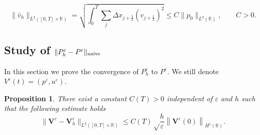 \documentclass[a4paper,french,english,10pt]{article}
\newcommand\eps{\varepsilon}
\newcommand\V{\mathbf{V}}
\newtheorem{proposition}[theorem]{Proposition}
\begin{document}
\begin{equation}\label{l2}
 \|\bar{v}_{h}\|_{L^2([0,T]\times\mathbb{R})}
=
\sqrt{
\int_0^T \sum_j \Delta x_{j+\frac12} (v_{j+\frac12} )^2
}
\leq
C\|p_0\|_{L^2(\mathbb R)}, \qquad C>0.
\end{equation}

\subsection{Study of $\| P_h^\varepsilon - P^\varepsilon   \|_{ {\rm naive}}$}


In this section we  
prove the 
convergence of $P_h^\varepsilon $ to  $P^\varepsilon $. We still denote $V^\eps(t)=(p^\eps,u^\eps)$.
\begin{proposition}\label{cv1d}
There exist a constant $C(T)>0$ independent of $\eps$ and $h$ 
 such that the following estimate holds 
\begin{equation*}
\|\V^{\eps}-\V^{\eps}_h \|_{L^2([0,T]\times \mathbb{R})}
\leq C(T) 
\sqrt \frac{h}\eps 
\left\| \V^{\eps}(0)
\right\|_{H^1(\mathbb{R})}.
\end{equation*}

\end{proposition}
\end{document}
